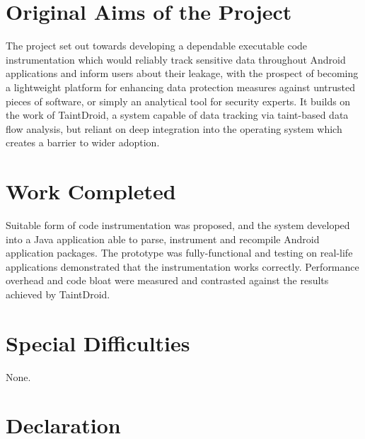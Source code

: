 \documentclass[12pt,twoside,notitlepage]{report}
\begin{document}
\vspace{-4mm}


\section*{Original Aims of the Project}

\vspace{-5mm}

The project set out towards developing a dependable executable code instrumentation which would reliably track sensitive data throughout Android applications and inform users about their leakage, with the prospect of becoming a lightweight platform for enhancing data protection measures against untrusted pieces of software, or simply an analytical tool for security experts. It builds on the work of TaintDroid, a system capable of data tracking via taint-based data flow analysis, but reliant on deep integration into the operating system which creates a barrier to wider adoption.

\vspace{-5mm}

\section*{Work Completed}

\vspace{-5mm}

Suitable form of code instrumentation was proposed, and the system developed into a Java application able to parse, instrument and recompile Android application packages. The prototype was fully-functional and testing on real-life applications demonstrated that the instrumentation works correctly. Performance overhead and code bloat were measured and contrasted against the results achieved by TaintDroid.

\vspace{-5mm}

\section*{Special Difficulties}

\vspace{-5mm}

None.
 
\newpage
\section*{Declaration}
\end{document}
